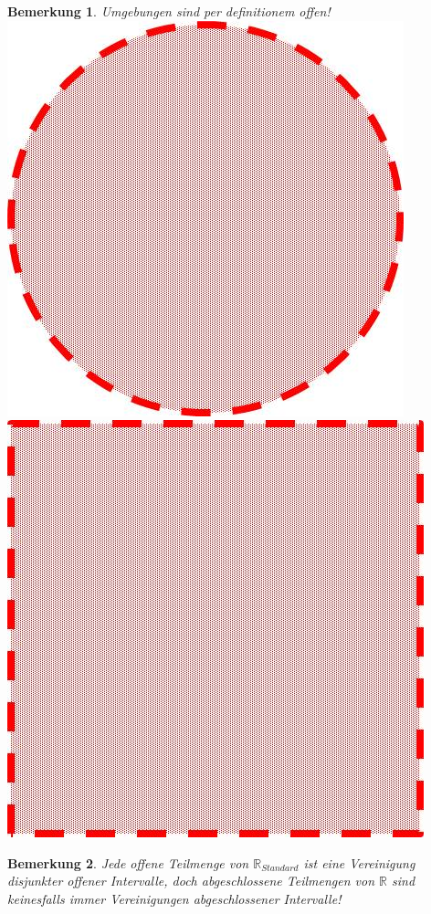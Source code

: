 \documentclass[a4paper,11pt,notitlepage]{report}
\newtheorem{remark}{Bemerkung}[chapter]
\newcommand{\R}{{\ensuremath{\mathbb{R}}}}
\begin{document}
\begin{remark}
	Umgebungen sind per definitionem offen! \newline
	\includegraphics[scale=0.3]{images/offener_Kreis.jpg} $\qquad\qquad$ \includegraphics[scale=0.3]{images/offenes_Quadrat.jpg}
\end{remark}

\begin{remark}
	Jede offene Teilmenge von $\R_{Standard}$ ist eine Vereinigung disjunkter offener Intervalle, doch abgeschlossene Teilmengen von $\R$ sind keinesfalls immer Vereinigungen abgeschlossener Intervalle!
\end{remark}
\end{document}
